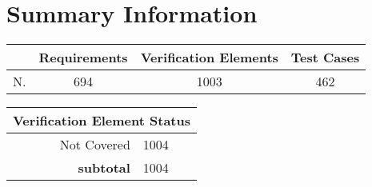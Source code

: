\newpage
\section{Summary Information}\label{sec:summary}
\begin{longtable}{rccc}
\toprule
 & \textbf{Requirements} & \textbf{Verification Elements} & \textbf{Test Cases} \\ \hline
N.& 694 & 1003 & 462 \\
\bottomrule
\end{longtable}
\begin{longtable}{rl}
\toprule
\multicolumn{2}{c}{\textbf{Verification Element Status}} \\ \hline
 Not Covered & 1004 \\
\hline
\textbf{subtotal} &  1004 \\
\bottomrule
\end{longtable}
